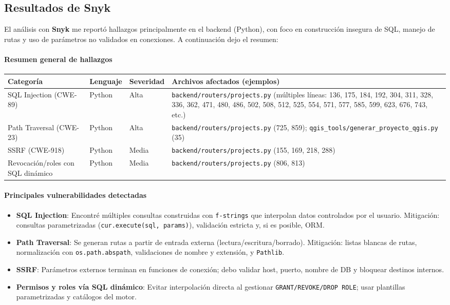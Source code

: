 \documentclass[12pt, a4paper]{article}
\begin{document}
\subsection{Resultados de Snyk}
El análisis con \textbf{Snyk} me reportó hallazgos principalmente en el backend (Python), con foco en construcción 
insegura de SQL, manejo de rutas y uso de parámetros no validados en conexiones. A continuación dejo el resumen:

\paragraph{Resumen general de hallazgos}
\begin{table}[h!]\footnotesize\centering
\begin{tabularx}{\textwidth}{@{} L{3.5cm} L{2.1cm} L{2.4cm} Y @{}}
\toprule
\textbf{Categoría} & \textbf{Lenguaje} & \textbf{Severidad} & \textbf{Archivos afectados (ejemplos)} \\
\midrule
SQL Injection (CWE-89) & Python & Alta & \texttt{backend/routers/projects.py} (múltiples líneas: 136, 175, 184, 192, 304, 311, 328, 336, 362, 471, 480, 486, 502, 508, 512, 525, 554, 571, 577, 585, 599, 623, 676, 743, etc.) \\
Path Traversal (CWE-23) & Python & Alta & \texttt{backend/routers/projects.py} (725, 859); \texttt{qgis\_tools/generar\_proyecto\_qgis.py} (35) \\
SSRF (CWE-918) & Python & Media & \texttt{backend/routers/projects.py} (155, 169, 218, 288) \\
Revocación/roles con SQL dinámico & Python & Media & \texttt{backend/routers/projects.py} (806, 813) \\
\bottomrule
\end{tabularx}
\end{table}

\paragraph{Principales vulnerabilidades detectadas}
\begin{itemize}
  \item \textbf{SQL Injection}: Encontré múltiples consultas construidas con \texttt{f-strings} que interpolan datos 
  controlados por el usuario. Mitigación: consultas parametrizadas (\texttt{cur.execute(sql, params)}), validación 
  estricta y, si es posible, ORM.
  \item \textbf{Path Traversal}: Se generan rutas a partir de entrada externa (lectura/escritura/borrado). Mitigación: 
  listas blancas de rutas, normalización con \texttt{os.path.abspath}, validaciones de nombre y extensión, y \texttt{Pathlib}.
  \item \textbf{SSRF}: Parámetros externos terminan en funciones de conexión; debo validar host, puerto, 
  nombre de DB y bloquear destinos internos.
  \item \textbf{Permisos y roles vía SQL dinámico}: Evitar interpolación directa al gestionar \texttt{GRANT/REVOKE/DROP ROLE}; 
  usar plantillas parametrizadas y catálogos del motor.
\end{itemize}
\end{document}
